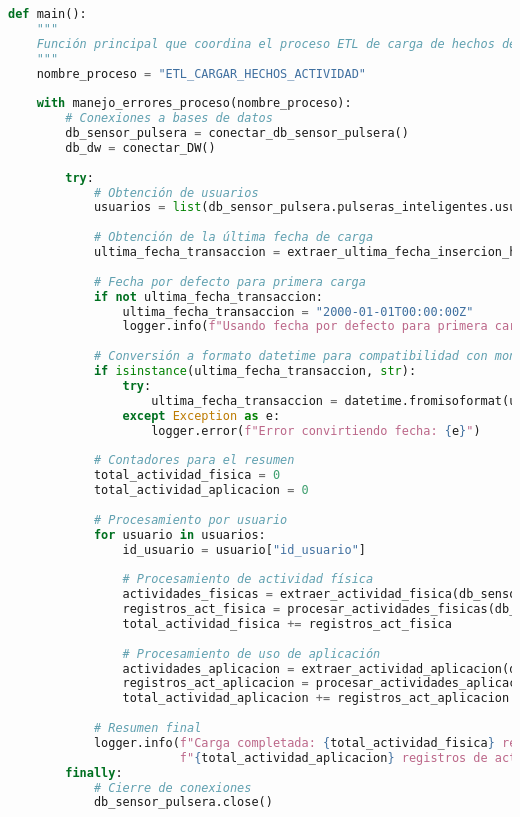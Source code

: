 \begin{lstlisting}[language=Python]
    def main():
    """
    Función principal que coordina el proceso ETL de carga de hechos de actividad.
    """
    nombre_proceso = "ETL_CARGAR_HECHOS_ACTIVIDAD"
    
    with manejo_errores_proceso(nombre_proceso):
        # Conexiones a bases de datos
        db_sensor_pulsera = conectar_db_sensor_pulsera()
        db_dw = conectar_DW()
        
        try:
            # Obtención de usuarios
            usuarios = list(db_sensor_pulsera.pulseras_inteligentes.usuarios_sensor.find())
            
            # Obtención de la última fecha de carga
            ultima_fecha_transaccion = extraer_ultima_fecha_insercion_hechos(db_dw, 'hechos_actividad')
            
            # Fecha por defecto para primera carga
            if not ultima_fecha_transaccion:
                ultima_fecha_transaccion = "2000-01-01T00:00:00Z"
                logger.info(f"Usando fecha por defecto para primera carga: {ultima_fecha_transaccion}")
            
            # Conversión a formato datetime para compatibilidad con mongo
            if isinstance(ultima_fecha_transaccion, str):
                try:
                    ultima_fecha_transaccion = datetime.fromisoformat(ultima_fecha_transaccion.replace("Z", "+00:00"))
                except Exception as e:
                    logger.error(f"Error convirtiendo fecha: {e}")
            
            # Contadores para el resumen
            total_actividad_fisica = 0
            total_actividad_aplicacion = 0
            
            # Procesamiento por usuario
            for usuario in usuarios:
                id_usuario = usuario["id_usuario"]
                
                # Procesamiento de actividad física
                actividades_fisicas = extraer_actividad_fisica(db_sensor_pulsera, id_usuario, ultima_fecha_transaccion)
                registros_act_fisica = procesar_actividades_fisicas(db_dw, actividades_fisicas, id_usuario)
                total_actividad_fisica += registros_act_fisica
                
                # Procesamiento de uso de aplicación
                actividades_aplicacion = extraer_actividad_aplicacion(db_sensor_pulsera, id_usuario, ultima_fecha_transaccion)
                registros_act_aplicacion = procesar_actividades_aplicacion(db_dw, actividades_aplicacion, id_usuario)
                total_actividad_aplicacion += registros_act_aplicacion
            
            # Resumen final
            logger.info(f"Carga completada: {total_actividad_fisica} registros de actividad física, " 
                        f"{total_actividad_aplicacion} registros de actividad de aplicación")
        finally:
            # Cierre de conexiones
            db_sensor_pulsera.close()
\end{lstlisting}

